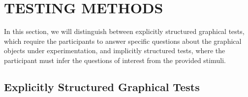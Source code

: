 \documentclass[letterpaper]{ar-1col}\usepackage[]{graphicx}\usepackage[]{color}
\newcommand{\svp}[1]{\textcolor{blue}{#1}}
\begin{document}

\section{TESTING METHODS} %

In this section, we will distinguish between explicitly structured graphical tests, which require the participants to answer specific questions about the graphical objects under experimentation, and implicitly structured tests, where the participant must infer the questions of interest from the provided stimuli.

\subsection{Explicitly Structured Graphical Tests} %
\end{document}
